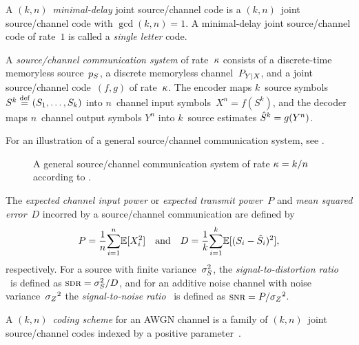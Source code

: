 \begin{definition}
  \label{def:mindelcode}
  A $(k,n)$~\emph{minimal-delay} joint source\slash channel code is a
  $(k,n)$~joint source/channel code with $\gcd(k,n) = 1$. A minimal-delay joint
  source/channel code of rate~$1$ is called a \emph{single letter} code.
\end{definition}

\begin{definition}
  \label{def:jointsccommsys}
  A \emph{source/channel communication system} of rate~$\kappa$ consists of a
  discrete-time memoryless source~${p_S}$, a discrete memoryless channel~$P_{Y|X}$,
  and a joint source/channel code~$(f,g)$ of rate~$\kappa$. The encoder maps
  $k$~source symbols $S^k \stackrel{\text{def}}{=} (S_1, \dots, S_k)$ into $n$~channel input
  symbols~$X^n = f(S^k)$, and the decoder maps $n$~channel output symbols $Y^n$
  into $k$~source estimates ${\hat{S}}^k = g(Y^n)$.
\end{definition}

For an illustration of a general source/channel communication system, see
.
\begin{figure}[tbp]
  \begin{center}
  \end{center}
  \caption{A general source/channel communication system of rate $\kappa = k/n$
  according to .}
  \label{fig:gensccommsys}
\end{figure}

\begin{definition}
  \label{def:PD}
  The \emph{expected channel input power} or \emph{expected transmit power}~$P$
  and \emph{mean squared error}~$D$ incorred by a source/channel communication
  are defined by
  \begin{equation*}
    P = \frac1n {\sum_{i=1}^n} \mathbb{E}[X_i^2] \quad \text{and} \quad
    D = \frac1k {\sum_{i=1}^k} \mathbb{E}[(S_i - {\hat{S}}_i)^2],
  \end{equation*}
  respectively. For a source with finite variance~${\sigma_S^2}$, the
  \emph{signal-to-distortion ratio} \sdr\ is defined as $\sdr = \ssq / D$, and
  for an additive noise channel with noise variance~${{\sigma_Z}^2}$ the
  \emph{signal-to-noise ratio} \snr\ is defined as $\snr = P/\szq$.
\end{definition}

\begin{definition}
  \label{def:codingscheme}
  A $(k,n)$~\emph{coding scheme} for an AWGN channel is a family of
  $(k,n)$~joint source/channel codes indexed by a positive parameter~\snr.
\end{definition}



